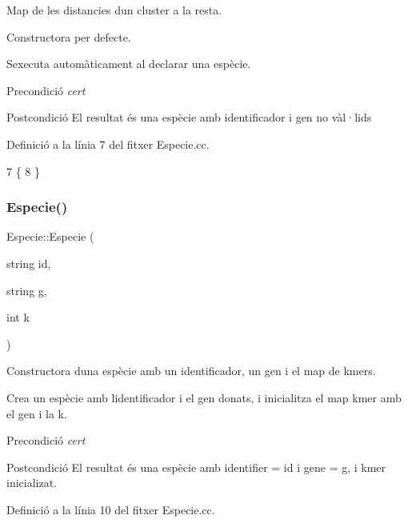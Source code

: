 Map de les distancies d\textquotesingle{}un cluster a la resta. 

Constructora per defecte.

S\textquotesingle{}executa automàticament al declarar una espècie.

\begin{DoxyPrecond}{Precondició}
{\itshape cert} 
\end{DoxyPrecond}
\begin{DoxyPostcond}{Postcondició}
El resultat és una espècie amb identificador i gen no vàl·lids 
\end{DoxyPostcond}


Definició a la línia 7 del fitxer Especie.\+cc.


\begin{DoxyCode}
7                  \{
8 \}
\end{DoxyCode}
\mbox{\label{class_especie_a00df4e464c347052383d92d310f68791}} 
\subsubsection{\texorpdfstring{Especie()}{Especie()}\hspace{0.1cm}{\footnotesize\ttfamily [2/2]}}
{\footnotesize\ttfamily Especie\+::\+Especie (\begin{DoxyParamCaption}\item[{string}]{id,  }\item[{string}]{g,  }\item[{int}]{k }\end{DoxyParamCaption})}



Constructora d\textquotesingle{}una espècie amb un identificador, un gen i el map de kmers. 

Crea un espècie amb l\textquotesingle{}identificador i el gen donats, i inicialitza el map kmer amb el gen i la k.

\begin{DoxyPrecond}{Precondició}
{\itshape cert} 
\end{DoxyPrecond}
\begin{DoxyPostcond}{Postcondició}
El resultat és una espècie amb identifier = id i gene = g, i kmer inicializat. 
\end{DoxyPostcond}


Definició a la línia 10 del fitxer Especie.\+cc.


